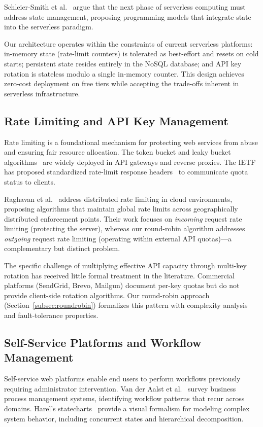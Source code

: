 \documentclass[11pt,a4paper]{article}
\theoremstyle{plain}
\theoremstyle{definition}
\begin{document}
Schleier-Smith et al.~\cite{schleier-smith2021} argue that the next phase of serverless computing must address state management, proposing programming models that integrate state into the serverless paradigm.

Our architecture operates within the constraints of current serverless platforms: in-memory state (rate-limit counters) is tolerated as best-effort and resets on cold starts; persistent state resides entirely in the NoSQL database; and API key rotation is stateless modulo a single in-memory counter. This design achieves zero-cost deployment on free tiers while accepting the trade-offs inherent in serverless infrastructure.

\subsection{Rate Limiting and API Key Management}

Rate limiting is a foundational mechanism for protecting web services from abuse and ensuring fair resource allocation. The token bucket and leaky bucket algorithms~\cite{tanenbaum2011} are widely deployed in API gateways and reverse proxies. The IETF has proposed standardized rate-limit response headers~\cite{ietf-ratelimit2024} to communicate quota status to clients.

Raghavan et al.~\cite{raghavan2007} address distributed rate limiting in cloud environments, proposing algorithms that maintain global rate limits across geographically distributed enforcement points. Their work focuses on \emph{incoming} request rate limiting (protecting the server), whereas our round-robin algorithm addresses \emph{outgoing} request rate limiting (operating within external API quotas)---a complementary but distinct problem.

The specific challenge of multiplying effective API capacity through multi-key rotation has received little formal treatment in the literature. Commercial platforms (SendGrid, Brevo, Mailgun) document per-key quotas but do not provide client-side rotation algorithms. Our round-robin approach (Section~\ref{subsec:roundrobin}) formalizes this pattern with complexity analysis and fault-tolerance properties.

\subsection{Self-Service Platforms and Workflow Management}

Self-service web platforms enable end users to perform workflows previously requiring administrator intervention. Van der Aalst et al.~\cite{vanderaalst2003} survey business process management systems, identifying workflow patterns that recur across domains. Harel's statecharts~\cite{harel1987} provide a visual formalism for modeling complex system behavior, including concurrent states and hierarchical decomposition.
\end{document}
